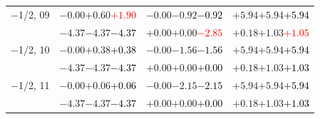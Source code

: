 \documentclass[compress]{beamer}
\begin{document}
\begin{frame}
\begin{tabular}{r | c | c | c}
$-$1/2, 09 & $-0.00$\hspace{0.1 cm}$+0.60$\hspace{0.1 cm}\textcolor{red}{$+1.90$} & $-0.00$\hspace{0.1 cm}$-0.92$\hspace{0.1 cm}\textcolor{black}{$-0.92$} & $+5.94$\hspace{0.1 cm}$+5.94$\hspace{0.1 cm}\textcolor{black}{$+5.94$} \\
           & $-4.37$\hspace{0.1 cm}$-4.37$\hspace{0.1 cm}\textcolor{black}{$-4.37$} & $+0.00$\hspace{0.1 cm}$+0.00$\hspace{0.1 cm}\textcolor{red}{$-2.85$} & $+0.18$\hspace{0.1 cm}$+1.03$\hspace{0.1 cm}\textcolor{red}{$+1.05$} \\
$-$1/2, 10 & $-0.00$\hspace{0.1 cm}$+0.38$\hspace{0.1 cm}\textcolor{black}{$+0.38$} & $-0.00$\hspace{0.1 cm}$-1.56$\hspace{0.1 cm}\textcolor{black}{$-1.56$} & $+5.94$\hspace{0.1 cm}$+5.94$\hspace{0.1 cm}\textcolor{black}{$+5.94$} \\
           & $-4.37$\hspace{0.1 cm}$-4.37$\hspace{0.1 cm}\textcolor{black}{$-4.37$} & $+0.00$\hspace{0.1 cm}$+0.00$\hspace{0.1 cm}\textcolor{black}{$+0.00$} & $+0.18$\hspace{0.1 cm}$+1.03$\hspace{0.1 cm}\textcolor{black}{$+1.03$} \\
$-$1/2, 11 & $-0.00$\hspace{0.1 cm}$+0.06$\hspace{0.1 cm}\textcolor{black}{$+0.06$} & $-0.00$\hspace{0.1 cm}$-2.15$\hspace{0.1 cm}\textcolor{black}{$-2.15$} & $+5.94$\hspace{0.1 cm}$+5.94$\hspace{0.1 cm}\textcolor{black}{$+5.94$} \\
           & $-4.37$\hspace{0.1 cm}$-4.37$\hspace{0.1 cm}\textcolor{black}{$-4.37$} & $+0.00$\hspace{0.1 cm}$+0.00$\hspace{0.1 cm}\textcolor{black}{$+0.00$} & $+0.18$\hspace{0.1 cm}$+1.03$\hspace{0.1 cm}\textcolor{black}{$+1.03$} \\

\end{tabular}
\end{frame}
\end{document}
